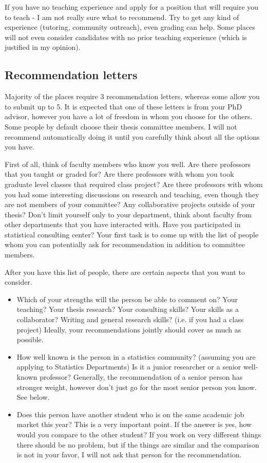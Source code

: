 \documentclass{article}
\begin{document}
If you have no teaching experience and apply for a position that will require you to teach - I am not really sure what to recommend. Try to get any kind of experience (tutoring, community outreach), even grading can help. Some places will not even consider candidates with no prior teaching experience (which is justified in my opinion).

\subsection{Recommendation letters}

Majority of the places require 3 recommendation letters, whereas some allow you to submit up to 5. It is expected that one of these letters is from your PhD advisor, however you have a lot of freedom in whom you choose for the others. Some people by default choose their thesis committee members. I will not recommend automatically doing it until you carefully think about all the options you have.

First of all, think of faculty members who know you well. Are there professors that you taught or graded for? Are there professors with whom you took graduate level classes that required class project? Are there professors with whom you had some interesting discussions on research and teaching, even though they are not members of your committee? Any collaborative projects outside of your thesis? Don't limit yourself only to your department, think about faculty from other departments that you have interacted with. Have you participated in statistical consulting center? Your first task is to come up with the list of people whom you can potentially ask for recommendation in addition to committee members.

After you have this list of people, there are certain aspects that you want to consider.
\begin{itemize}
\item Which of your strengths will the person be able to comment on? Your teaching? Your thesis research? Your consulting skills? Your skills as a collaborator? Writing and general research skills? (i.e. if you had a class project) Ideally, your recommendations jointly should cover as much as possible.
\item How well known is the person in a statistics community? (assuming you are applying to Statistics Departments) Is it a junior researcher or a senior well-known professor? Generally, the recommendation of a senior person has stronger weight, however don't just go for the most senior person you know. See below.
\item Does this person have another student who is on the same academic job market this year? This is a very important point. If the answer is yes, how would you compare to the other student? If you work on very different things there should be no problem, but if the things are similar and the comparison is not in your favor, I will not ask that person for the recommendation.
 \end{itemize}
\end{document}
